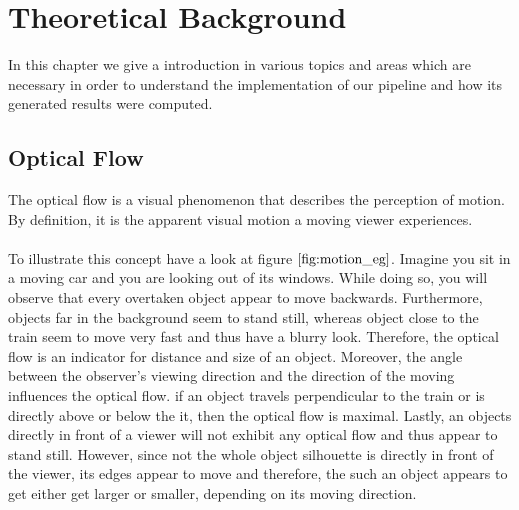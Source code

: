 \chapter{Theoretical Background}
In this chapter we give a introduction in various topics and areas which are necessary in order to understand the implementation of our pipeline and how its generated results were computed. 

\section{Optical Flow}
\label{sec:optical_flow}
The optical flow is a visual phenomenon that describes the perception of motion.
By definition, it is the apparent visual motion a moving viewer experiences. \\ \\
To illustrate this concept have a look at figure $\ref{fig:motion_eg}$. Imagine you sit in a moving car and you are looking out of its windows. While doing so, you will observe that every overtaken object appear to move backwards. Furthermore, objects far in the background seem to stand still, whereas object close to the train seem to move very fast and thus have a blurry look. Therefore, the optical flow is an indicator for distance and size of an object. Moreover, the angle between the observer's viewing direction and the direction of the moving influences the optical flow. if an object travels perpendicular to the train or is directly above or below the it, then the optical flow is maximal. Lastly, an objects directly in front of a viewer will not exhibit any optical flow and thus appear to stand still. However, since not the whole object silhouette is directly in front of the viewer, its edges appear to move and therefore, the such an object appears to get either get larger or smaller, depending on its moving direction.

